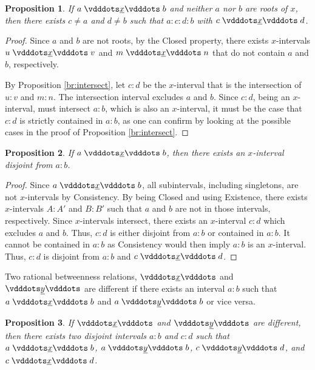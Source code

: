 \documentclass[12pt]{article}
\newtheorem{proposition}{Proposition}[section]
\begin{document}
\begin{proposition}\label{br:something-inside}
    If $a \xrel b$ and neither $a$ nor $b$ are roots of $x$, then there exists $c \neq a$ and $d \neq b$ such that $a : c : d : b$ with $c \xrel d$. 
\end{proposition}

\begin{proof}
    Since $a$ and $b$ are not roots, by the Closed property, there exists $x$-intervals $u \xrel v$ and $m \xrel n$ that do not contain $a$ and $b$, respectively.  

    By Proposition \ref{br:intersect}, let $c:d$ be the $x$-interval that is the intersection of $u:v$ and $m:n$. The intersection interval excludes $a$ and $b$. Since $c:d$, being an $x$-interval, must intersect $a:b$, which is also an $x$-interval, it must be the case that $c:d$ is strictly contained in $a:b$, as one can confirm by looking at the possible cases in the proof of Proposition \ref{br:intersect}.

\end{proof}


\begin{proposition}\label{br:something-outside}
    If \sout{$a \xrel b$}, then there exists an $x$-interval disjoint from $a:b$.
\end{proposition}

\begin{proof}
    Since \sout{$a \xrel b$}, all subintervals, including singletons, are not $x$-intervals by Consistency. By being Closed and using Existence, there exists $x$-intervals $A:A'$ and $B:B'$ such that $a$ and $b$ are not in those intervals, respectively. Since $x$-intervals intersect, there exists an $x$-interval $c:d$ which excludes $a$ and $b$. Thus, $c:d$ is either disjoint from $a:b$ or contained in $a:b$. It cannot be contained in $a:b$ as Consistency would then imply $a:b$ is an $x$-interval. Thus, $c:d$ is disjoint from $a:b$ and $c \xrel d$. 
    
\end{proof}


Two rational betweenness relations, $\xrel$ and $\xrel[y]$ are different if there exists an interval $a:b$ such that $a \xrel b$ and \sout{$a \xrel[y] b$} or vice versa. 

\begin{proposition}\label{br:different}
    If $\xrel$ and $\xrel[y]$ are different, then there exists two disjoint intervals $a:b$ and $c:d$ such that $a \xrel b$, \sout{$a \xrel[y] b$}, $c \xrel[y] d$, and \sout{$c \xrel d$}.
\end{proposition}
\end{document}
